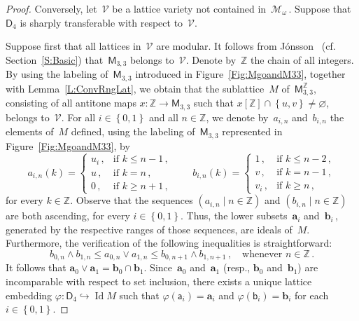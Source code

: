 \documentclass[reqno]{amsart}
\numberwithin{equation}{section}
\theoremstyle{plain}
\theoremstyle{definition}
\theoremstyle{remark}
\numberwithin{figure}{section}
\numberwithin{table}{section}
\begin{document}
\begin{proof}
Conversely, let~${\mathcal{V}}$ be a lattice variety not contained in~${\mathcal{M}}_{\omega}$\,.
Suppose that~${\mathsf{D}_{4}}$ is sharply transferable with respect to~${\mathcal{V}}$.

Suppose first that all lattices in~${\mathcal{V}}$ are modular.
It follows from J\'onsson~\cite{Jons68} (cf. Section~\ref{S:Basic}) that~${{\mathsf{M}}}_{3,3}$ belongs to~${\mathcal{V}}$.
Denote by~${\mathbb{Z}}$ the chain of all integers.
By using the labeling of~${{\mathsf{M}}}_{3,3}$ introduced in Figure~\ref{Fig:MgoandM33}, together with Lemma~\ref{L:ConvRngLat}, we obtain that the sublattice~$M$ of~${{\mathsf{M}}}_{3,3}^{\mathbb{Z}}$, consisting of all antitone maps $x\colon{\mathbb{Z}}\to{{\mathsf{M}}}_{3,3}$ such that $x[{\mathbb{Z}}]\cap{\left\{{u,v}\right\}}\neq{\varnothing}$, belongs to~${\mathcal{V}}$.
For all $i\in{\left\{{0,1}\right\}}$ and all $n\in{\mathbb{Z}}$, we denote by~$a_{i,n}$ and~$b_{i,n}$ the elements of~$M$ defined, using the labeling of~${{\mathsf{M}}}_{3,3}$ represented in Figure~\ref{Fig:MgoandM33}, by
 \[
 a_{i,n}(k)=\begin{cases}
 u_i\,,&\text{if }k\leq n-1\,,\\
 u\,,&\text{if }k=n\,,\\
 0\,,&\text{if }k\geq n+1\,,
 \end{cases}\qquad
 b_{i,n}(k)=\begin{cases}
 1\,,&\text{if }k\leq n-2\,,\\
 v\,,&\text{if }k=n-1\,,\\
 v_i\,,&\text{if }k\geq n\,,
 \end{cases}
 \]
for every $k\in{\mathbb{Z}}$.
Observe that the sequences ${\left({{a_{i,n}}}\mid{{n\in{\mathbb{Z}}}}\right)}$ and ${\left({{b_{i,n}}}\mid{{n\in{\mathbb{Z}}}}\right)}$ are both ascending, for every $i\in{\left\{{0,1}\right\}}$.
Thus, the lower subsets~${\boldsymbol{a}}_i$ and~${\boldsymbol{b}}_i$\,, generated by the respective ranges of those sequences, are ideals of~$M$.
Furthermore, the verification of the following inequalities is straightforward:
 \begin{equation}\label{Eq:Ineqainbjn}
 b_{0,n}\wedge b_{1,n}\leq a_{0,n}\vee a_{1,n}
 \leq b_{0,n+1}\wedge b_{1,n+1}\,,\quad\text{whenever }n\in{\mathbb{Z}}\,. 
 \end{equation}
It follows that ${\boldsymbol{a}}_0\vee{\boldsymbol{a}}_1={\boldsymbol{b}}_0\cap{\boldsymbol{b}}_1$.
Since~${\boldsymbol{a}}_0$ and~${\boldsymbol{a}}_1$ (resp., ${\boldsymbol{b}}_0$ and~${\boldsymbol{b}}_1$) are incomparable with respect to set inclusion, there exists a unique lattice embedding ${\varphi}\colon{\mathsf{D}_{4}}\hookrightarrow\operatorname{Id} M$ such that ${\varphi}({\mathsf{a}}_i)={\boldsymbol{a}}_i$ and ${\varphi}({\mathsf{b}}_i)={\boldsymbol{b}}_i$ for each $i\in{\left\{{0,1}\right\}}$.


\end{proof}
\end{document}

